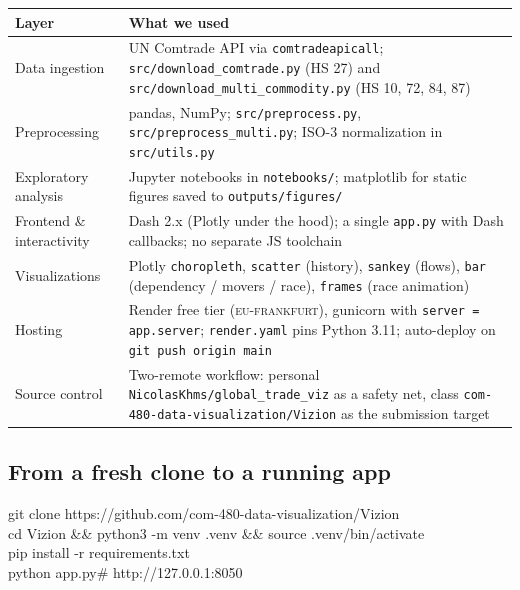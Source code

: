 \documentclass[a4paper,10pt]{article}
\begin{document}
\begin{table}[H]
\centering\small
\begin{tabular}{@{}p{4.0cm}p{11.7cm}@{}}
\toprule
\textbf{Layer} & \textbf{What we used} \\
\midrule
Data ingestion & UN Comtrade API via \texttt{comtradeapicall};
\texttt{src/download\_comtrade.py} (HS 27) and
\texttt{src/download\_multi\_commodity.py} (HS 10, 72, 84, 87) \\
Preprocessing & pandas, NumPy; \texttt{src/preprocess.py},
\texttt{src/preprocess\_multi.py}; ISO-3 normalization in \texttt{src/utils.py} \\
Exploratory analysis & Jupyter notebooks in \texttt{notebooks/}; matplotlib for
static figures saved to \texttt{outputs/figures/} \\
Frontend \& interactivity & Dash 2.x (Plotly under the hood); a single
\texttt{app.py} with Dash callbacks; no separate JS toolchain \\
Visualizations & Plotly \texttt{choropleth}, \texttt{scatter} (history),
\texttt{sankey} (flows), \texttt{bar} (dependency / movers / race),
\texttt{frames} (race animation) \\
Hosting & Render free tier (\textsc{eu-frankfurt}), gunicorn with
\texttt{server = app.server}; \texttt{render.yaml} pins Python 3.11; auto-deploy
on \texttt{git push origin main} \\
Source control & Two-remote workflow: personal
\texttt{NicolasKhms/global\_trade\_viz} as a safety net, class
\texttt{com-480-data-visualization/Vizion} as the submission target \\
\bottomrule
\end{tabular}
\end{table}

\subsection{From a fresh clone to a running app}

\begin{tcolorbox}[colback=warmSoft!50, colframe=warm, boxrule=0.4pt, arc=2pt, fontupper=\ttfamily\small, left=8pt, right=8pt]
git clone https://github.com/com-480-data-visualization/Vizion\\
cd Vizion \&\& python3 -m venv .venv \&\& source .venv/bin/activate\\
pip install -r requirements.txt\\
python app.py\hspace{2em}\# http://127.0.0.1:8050
\end{tcolorbox}
\end{document}
